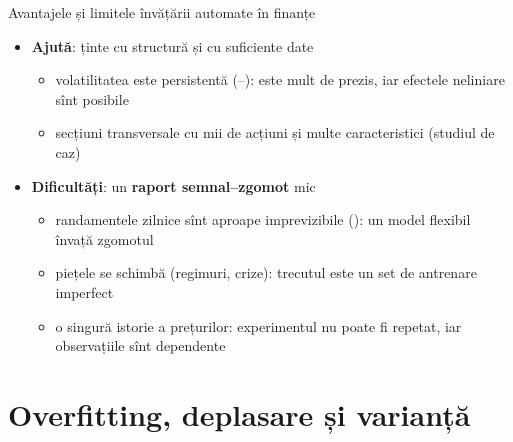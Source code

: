 \begin{frame}{Avantajele și limitele învățării automate în finanțe}
\itemsize{\small}
\begin{itemize}
    \item \textbf{Ajută}: ținte cu structură și cu suficiente date
    \begin{itemize}
        \item volatilitatea este persistentă (--): este mult de prezis, iar efectele neliniare sînt posibile
        \item secțiuni transversale cu mii de acțiuni și multe caracteristici (studiul de caz)
    \end{itemize}
    \item \textbf{Dificultăți}: un \textbf{raport semnal--zgomot} mic
    \begin{itemize}
        \item randamentele zilnice sînt aproape imprevizibile (): un model flexibil învață zgomotul
        \item piețele se schimbă (regimuri, crize): trecutul este un set de antrenare imperfect
        \item o singură istorie a prețurilor: experimentul nu poate fi repetat, iar observațiile sînt dependente
    \end{itemize}
\end{itemize}
\end{frame}


\section{Overfitting, deplasare și varianță}

